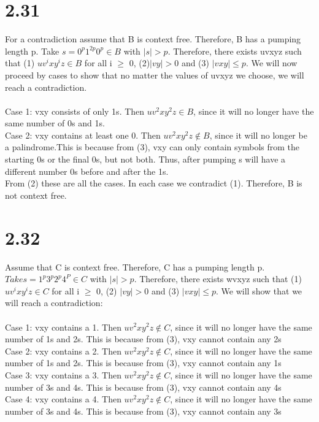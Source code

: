 \documentclass{scrartcl}
\begin{document}
\section*{2.31}
For a contradiction assume that B is context free. Therefore, B has a pumping length p. Take $s = 0^p1^{2p}0^p \in B$ with $\mid s \mid > p.$ Therefore, there exists uvxyz such that (1) $uv^ixy^iz \in B$ for all i $\geq$ 0, (2)$ \mid vy \mid > 0$ and (3) $\mid vxy \mid \leq p$. We will now proceed by cases to show that no matter the values of uvxyz we choose, we will reach a contradiction.\\
\\
Case 1: vxy consists of only 1s. Then $uv^2xy^2z \in B$, since it will no longer have the same number of 0s and 1s.\\
Case 2: vxy contains at least one 0. Then $uv^2xy^2z \notin B$, since it will no longer be a palindrome.This is because from (3), vxy can only contain symbols from the starting 0s or the
final 0s, but not both. Thus, after pumping s will have a different number 0s before and
after the 1s.
\\
From (2) these are all the cases. In each case we contradict (1). Therefore, B is not
context free.



\section*{2.32}
Assume that C is context free. Therefore, C has a pumping length p. $Take s=1^p3^p2^p4^P \in C$
with $\mid s \mid > p$. Therefore, there exists wvxyz such that (1) $uv^ixy^iz \in C$ for all i $\geq$ 0, (2) $\mid vy \mid > 0$ and (3) $\mid vxy \mid \leq p$. We will show that we will reach a contradiction:\\
\\
Case 1: vxy contains a 1. Then $uv^2xy^2z \notin C$, since it will no longer have the same number of 1s and 2s. This is because from (3), vxy cannot contain any 2s\\
Case 2: vxy contains a 2. Then $uv^2xy^2z \notin C$, since it will no longer have the same number of 1s and 2s. This is because from (3), vxy cannot contain any 1s\\
Case 3: vxy contains a 3. Then $uv^2xy^2z \notin C$, since it will no longer have the same number of 3s and 4s. This is because from (3), vxy cannot contain any 4s\\
Case 4: vxy contains a 4. Then $uv^2xy^2z \notin C$, since it will no longer have the same number of 3s and 4s. This is because from (3), vxy cannot contain any 3s\\
\\
\end{document}
